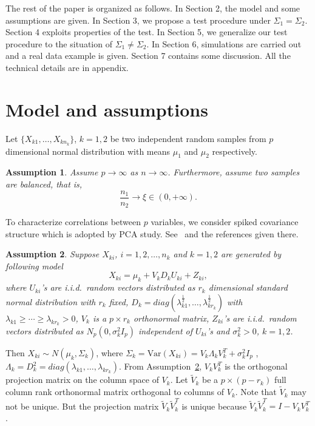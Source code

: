 \documentclass[review]{elsarticle}
\theoremstyle{plain}
\newtheorem{assumption}{\quad\quad Assumption}
\theoremstyle{definition}
\theoremstyle{remark}
\begin{document}
The rest of the paper is organized as follows. In Section 2,  the model and some assumptions are given.  In Section 3, we propose a test procedure under $\Sigma_1=\Sigma_2$. Section 4 exploits properties of the test. In Section 5, we generalize our test procedure to the situation of $\Sigma_1\neq \Sigma_2$. In Section 6, simulations are carried out and  a real data example is given. Section 7 contains some discussion. All the technical details are in appendix.

\section{Model and assumptions}


Let $\{X_{k1},\ldots,X_{kn_k}\}$, $k=1, 2$ be two independent  random samples from $p$ dimensional normal distribution with means $\mu_1$ and $\mu_2$ respectively.

\begin{assumption}\label{balance}
Assume $p\to \infty$ as $n\to \infty$. Furthermore, assume two samples are balanced, that is,
\begin{equation*}
    \frac{n_1}{n_2}\to \xi \in (0,+\infty).
\end{equation*}
\end{assumption}

To characterize correlations between $p$ variables, we consider spiked covariance structure which is adopted by PCA study. See~\cite{Cai2012Sparse} and the references given there.
\begin{assumption}\label{theModel}
Suppose $X_{ki}$, $i=1,2,\ldots,n_k$ and $k=1,2$ are generated by  following model
\begin{equation*}
X_{ki}=\mu_k+V_k D_k U_{ki}+Z_{ki},
\end{equation*}
where
$U_{ki}$'s are i.i.d.\  random vectors distributed as $r_k$ dimensional standard normal distribution with $r_k$ fixed, 
$D_k=diag(\lambda_{k1}^{\frac{1}{2}},\ldots,\lambda_{k{r_k}}^{\frac{1}{2}})$ with $\lambda_{k1}\geq \cdots \geq \lambda_{k{r_k}}>0$,
$V_k$ is  a $p\times r_k$ orthonormal matrix, $Z_{ki}$'s are i.i.d.\ random vectors distributed as  $N_p(0,\sigma^2_k I_p)$ independent of $U_{ki}$'s and $\sigma^2_k>0$, $k=1,2$.
\end{assumption}
Then $X_{ki}\sim N(\mu_k,\Sigma_k)$, where $ 
\Sigma_k=\textrm{Var}(X_{ki})=V_k\Lambda_k V_k^T+\sigma^2_k I_p
$
, $\Lambda_k=D_k^2=diag(\lambda_{k1},\ldots,\lambda_{k{r_k}})$.
From Assumption~\ref{theModel}, $V_k V_k^T$ is the orthogonal projection matrix on the column space of $V_k$. Let $\tilde{V}_k$ be a $p\times (p-r_k)$ full column rank orthonormal matrix orthogonal to columns of  $V_k$.
 Note that $\tilde{V}_k$ may not be unique. But the projection matrix $\tilde{V}_k\tilde{V}_k^T$ is unique because $\tilde{V}_k\tilde{V}_k^T=I-V_k V_k^T$.
\end{document}

